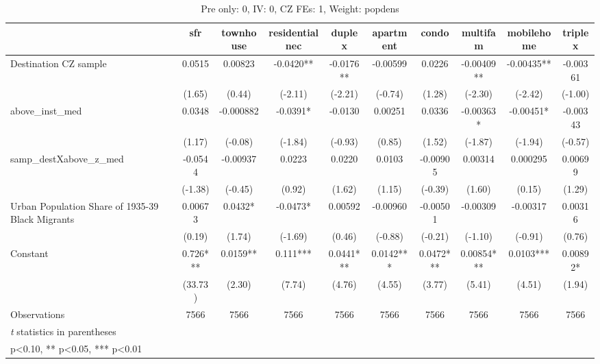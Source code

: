 \begin{table}[htbp]\centering
\def\sym#1{\ifmmode^{#1}\else\(^{#1}\)\fi}
\caption{Pre only: 0, IV: 0, CZ FEs: 1, Weight: popdens}
\begin{tabular}{l*{9}{c}}
\toprule
                    &\multicolumn{1}{c}{sfr}&\multicolumn{1}{c}{townhouse}&\multicolumn{1}{c}{residentialnec}&\multicolumn{1}{c}{duplex}&\multicolumn{1}{c}{apartment}&\multicolumn{1}{c}{condo}&\multicolumn{1}{c}{multifam}&\multicolumn{1}{c}{mobilehome}&\multicolumn{1}{c}{triplex}\\
\midrule
Destination CZ sample&      0.0515   &     0.00823   &     -0.0420** &     -0.0176** &    -0.00599   &      0.0226   &    -0.00409** &    -0.00435** &    -0.00361   \\
                    &      (1.65)   &      (0.44)   &     (-2.11)   &     (-2.21)   &     (-0.74)   &      (1.28)   &     (-2.30)   &     (-2.42)   &     (-1.00)   \\
\addlinespace
above\_inst\_med      &      0.0348   &   -0.000882   &     -0.0391*  &     -0.0130   &     0.00251   &      0.0336   &    -0.00363*  &    -0.00451*  &    -0.00343   \\
                    &      (1.17)   &     (-0.08)   &     (-1.84)   &     (-0.93)   &      (0.85)   &      (1.52)   &     (-1.87)   &     (-1.94)   &     (-0.57)   \\
\addlinespace
samp\_destXabove\_z\_med&     -0.0544   &    -0.00937   &      0.0223   &      0.0220   &      0.0103   &    -0.00905   &     0.00314   &    0.000295   &     0.00699   \\
                    &     (-1.38)   &     (-0.45)   &      (0.92)   &      (1.62)   &      (1.15)   &     (-0.39)   &      (1.60)   &      (0.15)   &      (1.29)   \\
\addlinespace
Urban Population Share of 1935-39 Black Migrants&     0.00673   &      0.0432*  &     -0.0473*  &     0.00592   &    -0.00960   &    -0.00501   &    -0.00309   &    -0.00317   &     0.00316   \\
                    &      (0.19)   &      (1.74)   &     (-1.69)   &      (0.46)   &     (-0.88)   &     (-0.21)   &     (-1.10)   &     (-0.91)   &      (0.76)   \\
\addlinespace
Constant            &       0.726***&      0.0159** &       0.111***&      0.0441***&      0.0142***&      0.0472***&     0.00854***&      0.0103***&     0.00892*  \\
                    &     (33.73)   &      (2.30)   &      (7.74)   &      (4.76)   &      (4.55)   &      (3.77)   &      (5.41)   &      (4.51)   &      (1.94)   \\
\midrule
Observations        &        7566   &        7566   &        7566   &        7566   &        7566   &        7566   &        7566   &        7566   &        7566   \\
\bottomrule
\multicolumn{10}{l}{\footnotesize \textit{t} statistics in parentheses}\\
\multicolumn{10}{l}{\footnotesize * p<0.10, ** p<0.05, *** p<0.01}\\
\end{tabular}
\end{table}

